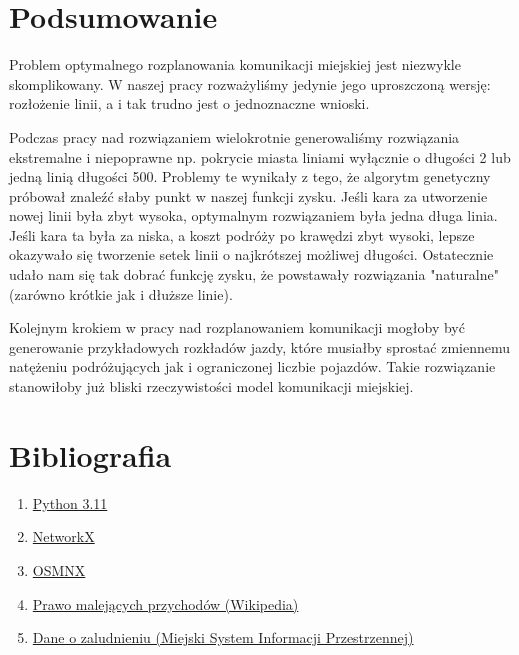 \documentclass[12pt,a4paper]{article}
\begin{document}
\section{Podsumowanie}

Problem optymalnego rozplanowania komunikacji miejskiej jest niezwykle skomplikowany. W naszej pracy rozważyliśmy jedynie jego uproszczoną wersję: rozłożenie linii, a i tak trudno jest o jednoznaczne wnioski.

Podczas pracy nad rozwiązaniem wielokrotnie generowaliśmy rozwiązania ekstremalne i niepoprawne np. pokrycie miasta liniami wyłącznie o długości 2 lub jedną linią długości 500. Problemy te wynikały z tego, że algorytm genetyczny próbował znaleźć słaby punkt w naszej funkcji zysku. Jeśli kara za utworzenie nowej linii była zbyt wysoka, optymalnym rozwiązaniem była jedna długa linia. Jeśli kara ta była za niska, a koszt podróży po krawędzi zbyt wysoki, lepsze okazywało się tworzenie setek linii o najkrótszej możliwej długości. Ostatecznie udało nam się tak dobrać funkcję zysku, że powstawały rozwiązania "naturalne" (zarówno krótkie jak i dłuższe linie).

Kolejnym krokiem w pracy nad rozplanowaniem komunikacji mogłoby być generowanie przykładowych rozkładów jazdy, które musiałby sprostać zmiennemu natężeniu podróżujących jak i ograniczonej liczbie pojazdów. Takie rozwiązanie stanowiłoby już bliski rzeczywistości model komunikacji miejskiej.

\section{Bibliografia}
\begin{enumerate}

\item\href{
https://docs.python.org/3/
}{Python 3.11}

\item\href{
https://networkx.org/documentation/stable/index.html
}{NetworkX}

\item\href{https://osmnx.readthedocs.io/en/stable/}{OSMNX}

\item\href{https://pl.wikipedia.org/wiki/Prawo_malej%C4%85cych_przychod%C3%B3w}{Prawo malejących przychodów (Wikipedia)}

\item\href{https://msip.krakow.pl}{Dane o zaludnieniu (Miejski System Informacji Przestrzennej)}
\end{enumerate}
\end{document}
